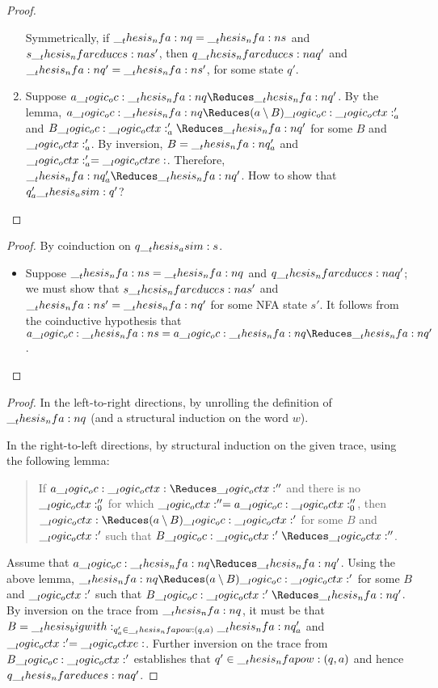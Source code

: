 \begin{proof}
\begin{enumerate}
    Symmetrically, if $\__thesis_nfa:n {q} = \__thesis_nfa:n {s}$ and $s \nfareduces[a] s'$, then $q \nfareduces[a] q'$ and $\__thesis_nfa:n {q}' = \__thesis_nfa:n {s}'$, for some state $q'$.

    
  \item Suppose $a \oc \nfa{q} \Reduces \nfa{q}'$.
    By the lemma, $a \oc \nfa{q} \Reduces (a \limp B) \oc \octx'_a$ and $B \oc \octx'_a \Reduces \nfa{q}'$ for some $B$ and $\__logic_octx:'_a$.
    By inversion, $B = \__thesis_nfa:n {q}'_a$ and $\__logic_octx:'_a = \__logic_octxe:$.
    Therefore, $\nfa{q}'_a \Reduces \nfa{q}'$.
    How to show that $q'_a \__thesis_asim: q'$?
  \end{enumerate}
\end{proof}
%
\begin{proof}
  By coinduction on $q \__thesis_asim: s$.
  \begin{itemize}
  \item Suppose $\__thesis_nfa:n {s} = \__thesis_nfa:n {q}$ and $q \nfareduces[a] q'$; we must show that $s \nfareduces[a] s'$ and $\__thesis_nfa:n {s}' = \__thesis_nfa:n {q}'$ for some \ac{NFA} state $s'$.
    It follows from the coinductive hypothesis that $a \oc \nfa{s} = a \oc \nfa{q} \Reduces \nfa{q}'$.
  \end{itemize}
\end{proof}
%
\begin{proof}
  In the left-to-right directions, by unrolling the definition of $\__thesis_nfa:n {q}$ (and a structural induction on the word $w$).

  In the right-to-left directions, by structural induction on the given trace, using the following lemma:
  \begin{quotation}
    \normalsize
    If $a \oc \octx \Reduces \octx''$ and there is no $\__logic_octx:''_0$ for which $\__logic_octx:'' = a \__logic_oc: \__logic_octx:''_0$, then\\ $\octx \Reduces (a \limp B) \oc \octx'$ for some $B$ and $\__logic_octx:'$ such that $B \oc \octx' \Reduces \octx''$.
  \end{quotation}

  Assume that $a \oc \nfa{q} \Reduces \nfa{q}'$.
  Using the above lemma, $\nfa{q} \Reduces (a \limp B) \oc \octx'$ for some $B$ and $\__logic_octx:'$ such that $B \oc \octx' \Reduces \nfa{q}'$.
  By inversion on the trace from $\__thesis_nfa:n {q}$, it must be that $B = \__thesis_bigwith:_{q'_a \in \__thesis_nfapow:(q,a)} \__thesis_nfa:n {q}'_a$ and $\__logic_octx:' = \__logic_octxe:$.
  Further inversion on the trace from $B \__logic_oc: \__logic_octx:'$ establishes that $q' \in \__thesis_nfapow:(q,a)$ and hence $q \nfareduces[\smash{a}] q'$.
\end{proof}






